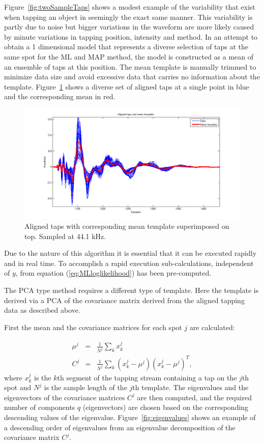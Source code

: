 Figure~\ref{fig:twoSampleTaps} shows a modest example of the variability that exist when tapping an object in seemingly the exact same manner. This variability is partly due to noise but bigger variations in the waveform are more likely caused by minute variations in tapping position, intensity and method. In an attempt to obtain a 1 dimensional model that represents a diverse selection of taps at the same spot for the ML and MAP method, the model is constructed as a mean of an ensemble of taps at this position. The mean template is manually trimmed to minimize data size and avoid excessive data that carries no information about the template. Figure~\ref{fig:alignedAndMean} shows a diverse set of aligned taps at a single point in blue and the corresponding mean in red.

\begin{figure}[!]
\centering
\includegraphics[width=150mm]{alignedAndMean.png}
\caption{Aligned taps with corresponding mean template superimposed on top. Sampled at 44.1 kHz.}\label{fig:alignedAndMean}
\end{figure}

Due to the nature of this algorithm it is essential that it can be executed rapidly and in real time. To accomplish a rapid execution sub-calculations, independent of $y$, from equation (\ref{eq:MLloglikelihood}) has been pre-computed.

The PCA type method requires a different type of template. Here the template is derived via a PCA of the covariance matrix derived from the aligned tapping data as described above.

First the mean and the covariance matrices for each spot $j$ are calculated:

\begin{eqnarray}\nonumber
\mu^j &=& \frac{1}{N^j} \sum_k x^j_k \\\label{eq:PCAcovariance}
C^j &=& \frac{1}{N^j}\sum_k \left(x^j_k - \mu^j\right)\left(x^j_k - \mu^j\right)^T,
\end{eqnarray}
where $x^j_k$ is the $k$th segment of the tapping stream containing a tap on the $j$th spot and $N^j$ is the sample length of the $j$th template. The eigenvalues and the eigenvectors of the covariance matrices $C^j$ are then computed, and the required number of components $q$ (eigenvectors) are chosen based on the corresponding descending values of the eigenvalue. Figure~\ref{fig:eigenvalues} shows an example of a descending order of eigenvalues from an eigenvalue decomposition of the covariance matrix $C^j$.

